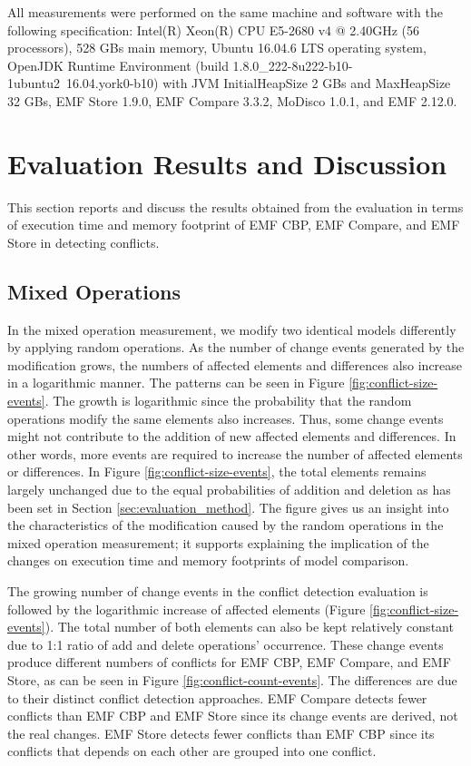 All measurements were performed on the same machine and software with the following specification: Intel(R) Xeon(R) CPU E5-2680 v4 @ 2.40GHz (56 processors), 528 GBs main memory, Ubuntu 16.04.6 LTS operating system, OpenJDK Runtime Environment (build 1.8.0\_222-8u222-b10-1ubuntu2~16.04.york0-b10) with JVM \textsf{InitialHeapSize} 2 GBs and \textsf{MaxHeapSize} 32 GBs, EMF Store 1.9.0, EMF Compare 3.3.2, MoDisco 1.0.1, and EMF 2.12.0.

\section{Evaluation Results and Discussion}
\label{sec:evaluation_discussion}
This section reports and discuss the results obtained from the evaluation in terms of execution time and memory footprint of EMF CBP, EMF Compare, and EMF Store in detecting conflicts. 

\subsection{Mixed Operations}
\label{sec:mixed-operation_conflict}

In the mixed operation measurement, we modify two identical models differently by applying random operations. As the number of change events generated by the modification grows, the numbers of affected elements and differences also increase in a logarithmic manner. The patterns can be seen in Figure \ref{fig:conflict-size-events}. The growth is logarithmic since the probability that the random operations modify the same elements also increases. Thus, some change events might not contribute to the addition of new affected elements and differences. In other words, more events are required to increase the number of affected elements or differences. In Figure \ref{fig:conflict-size-events}, the total elements remains largely unchanged due to the equal probabilities of addition and deletion as has been set in Section \ref{sec:evaluation_method}. The figure gives us an insight into the characteristics of the modification caused by the random operations in the mixed operation measurement; it supports explaining the implication of the changes on execution time and memory footprints of model comparison.

The growing number of change events in the conflict detection evaluation is followed by the logarithmic increase of affected elements (Figure \ref{fig:conflict-size-events}). The total number of both elements can also be kept relatively constant due to 1:1 ratio of \textsf{add} and \textsf{delete} operations' occurrence. These change events produce different numbers of conflicts for EMF CBP, EMF Compare, and EMF Store, as can be seen in Figure \ref{fig:conflict-count-events}. The differences are due to their distinct conflict detection approaches. EMF Compare detects fewer conflicts than EMF CBP and EMF Store since its change events are derived, not the real changes. EMF Store detects fewer conflicts than EMF CBP since its conflicts that depends on each other are grouped into one conflict.

